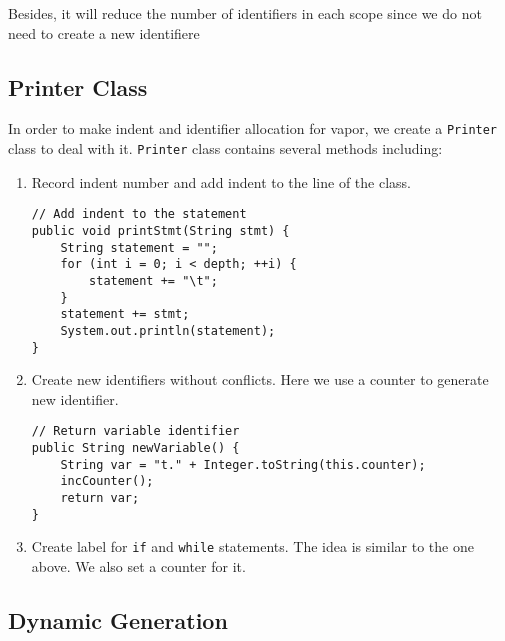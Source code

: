 \documentclass[letterpaper, 14pt]{article}
\begin{document}
Besides, it will reduce the number of identifiers in each scope since we do not need to create a new identifiere

\subsection{Printer Class}

In order to make indent and identifier allocation for vapor, we create a \texttt{Printer} class to deal with it. \texttt{Printer} class contains several methods including:
\begin{enumerate}
\item Record indent number and add indent to the line of the class. 
\begin{lstlisting}
// Add indent to the statement
public void printStmt(String stmt) {
	String statement = "";
	for (int i = 0; i < depth; ++i) {
		statement += "\t";
	}
	statement += stmt;
	System.out.println(statement);
}
\end{lstlisting}
\item Create new identifiers without conflicts. Here we use a counter to generate new identifier. 
\begin{lstlisting}
// Return variable identifier
public String newVariable() {
	String var = "t." + Integer.toString(this.counter);
	incCounter();
	return var;
}
\end{lstlisting}
\item Create label for \texttt{if} and \texttt{while} statements. The idea is similar to the one above. We also set a counter for it. 
\end{enumerate}

\subsection{Dynamic Generation}
\end{document}
